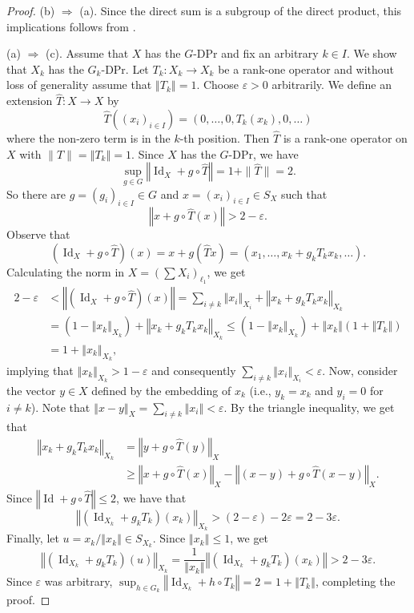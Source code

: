 \documentclass[10pt,a4paper]{amsart}
\newcommand{\e}{\varepsilon}
\newcommand{\eps}{\e}
\renewcommand{\geq}{\geqslant}
\DeclareMathOperator{\id}{Id}
\renewcommand{\leq}{\leqslant}
\newcommand{\norm}[1]{\left\Vert#1\right\Vert}
\begin{document}
	\begin{proof} (b) $\Rightarrow$ (a). Since the direct sum is a subgroup of the direct product, this implications follows from .  
		
		\noindent
		(a) $\Rightarrow$ (c). Assume that $X$ has the $G$-DPr and fix an arbitrary $k \in I$. We show that $X_k$ has the $G_k$-DPr. Let $T_k: X_k \to X_k$ be a rank-one operator and without loss of generality assume that $\norm{T_k} = 1$. Choose $\eps > 0$ arbitrarily. We define an extension $\hat{T}: X \to X$ by
		\[
		\hat{T}((x_i)_{i \in I}) = (0, \dots, 0, T_k(x_k), 0, \dots)
		\]
		where the non-zero term is in the $k$-th position. Then $\hat{T}$ is a rank-one operator on $X$ with $\|\hat{T}\| = \norm{T_k} = 1$. Since $X$ has the $G$-DPr, we have
		\[
		\sup_{g \in G} \norm{\id_X + g \circ \hat{T}} = 1 + \|\hat{T}\| = 2.
		\]
		So there are $g = (g_i)_{i \in I} \in G$ and $x = (x_i)_{i \in I} \in S_X$ such that
		\begin{equation*}
			\norm{x + g \circ \hat{T}(x)} > 2 - \eps.
		\end{equation*}
		Observe that
		\[
		(\id_X + g \circ \hat{T})(x) = x + g(\hat{T}x) = (x_1, \dots, x_k + g_k T_k x_k, \dots).
		\]
		Calculating the norm in $X = (\sum X_i)_{\ell_1}$, we get
		\begin{align*}
			2 - \eps
			&< \norm{(\id_X + g \circ \hat{T})(x)}
			= \sum_{i \neq k} \norm{x_i}_{X_i} + \norm{x_k + g_k T_k x_k}_{X_k}\\
			&= (1 - \norm{x_k}_{X_k}) + \norm{x_k + g_k T_k x_k}_{X_k}
			\leq (1 - \norm{x_k}_{X_k}) + \norm{x_k} (1 + \norm{T_k})\\
			&= 1 + \norm{x_k}_{X_k},
		\end{align*}
		implying that $\norm{x_k}_{X_k} > 1 - \eps$ and consequently $\sum_{i \neq k} \norm{x_i}_{X_i} < \eps$.
		Now, consider the vector $y \in X$ defined by the embedding of $x_k$ (i.e., $y_k = x_k$ and $y_i = 0$ for $i \neq k$). Note that $\norm{x - y}_X = \sum_{i \neq k} \norm{x_i} < \e$. By the triangle inequality, we get that
		\begin{align*}
			\norm{x_k + g_k T_k x_k}_{X_k}
			&= \norm{y + g \circ \hat{T}(y)}_X \\
			&\geq \norm{x + g \circ \hat{T}(x)}_X - \norm{(x - y) + g \circ \hat{T}(x - y)}_X.
		\end{align*}
		Since $\norm{\id + g \circ \hat{T}} \leq 2$, we have that
		\[
		\norm{(\id_{X_k} + g_k T_k)(x_k)}_{X_k} > (2 - \e) - 2\e = 2 - 3\e.
		\]
		Finally, let $u = x_k / \norm{x_k} \in S_{X_k}$. Since $\norm{x_k} \leq 1$, we get
		\[
		\norm{(\id_{X_k} + g_k T_k)(u)}_{X_k} = \frac{1}{\norm{x_k}} \norm{(\id_{X_k} + g_k T_k)(x_k)} > 2 - 3\e.
		\]
		Since $\e$ was arbitrary, $\sup_{h \in G_k} \norm{\id_{X_k} + h \circ T_k} = 2 = 1 + \norm{T_k}$, completing the proof.
		

\end{proof}
\end{document}
